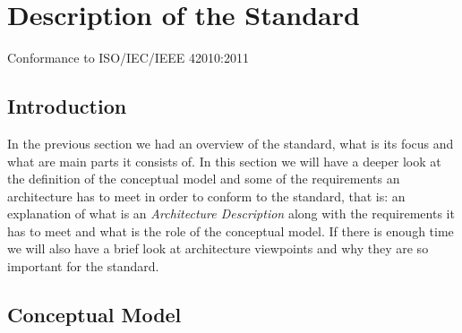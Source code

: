 \section{Description of the Standard}

	\begin{frame}
		\begin{LARGE}
			Conformance to ISO/IEC/IEEE 42010:2011
		\end{LARGE}
	\end{frame}
	
	\subsection{Introduction}
	
		\begin{frame}
			\vspace{0.3cm}
			In the previous section we had an overview of the standard, what is its focus and what are main parts it consists of.\newline\newline
			In this section we will have a deeper look at the definition of the conceptual model and some of the requirements an architecture has to meet in order to conform to the standard, that is: an explanation of what is an \emph{Architecture Description} along with the requirements it has to meet and what is the role of the conceptual model.\newline\newline
			If there is enough time we will also have a brief look at architecture viewpoints and why they are so important for the standard.
		\end{frame}
		
	\subsection{Conceptual Model}
	
